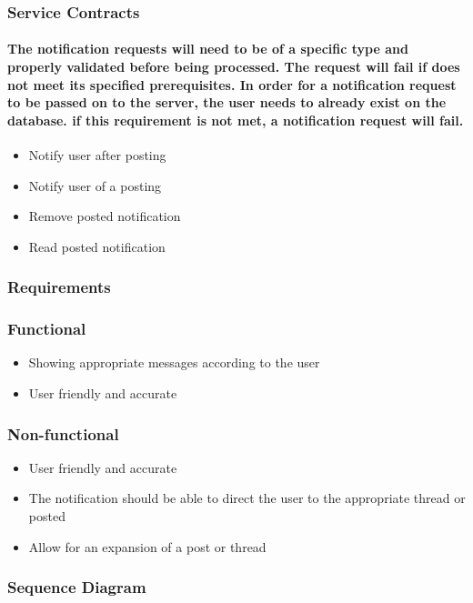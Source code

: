 \documentclass[12pt]{article}
\begin{document}
\subsubsection{Service Contracts}
\paragraph{The notification requests will need to be of a specific type and properly validated before being processed. The request will fail if does not meet its specified prerequisites. In order for a notification request to be passed on to the server, the user needs to already exist on the database. if this requirement is not met, a notification request will fail.}
\begin{itemize}
\item Notify user after posting
\item Notify user of a posting
\item Remove posted notification 
\item Read posted notification
\end{itemize}
\subsubsection{Requirements}
\subsubsection*{Functional}
\begin{itemize}
\item Showing appropriate messages according to the user
\item User friendly and accurate
\end{itemize}
\subsubsection*{Non-functional}
\begin{itemize}
\item User friendly and accurate
\item The notification should be able to direct the user to the appropriate thread or posted
\item Allow for an expansion of a post or thread 
\end{itemize}

\subsubsection{Sequence Diagram}
\end{document}
